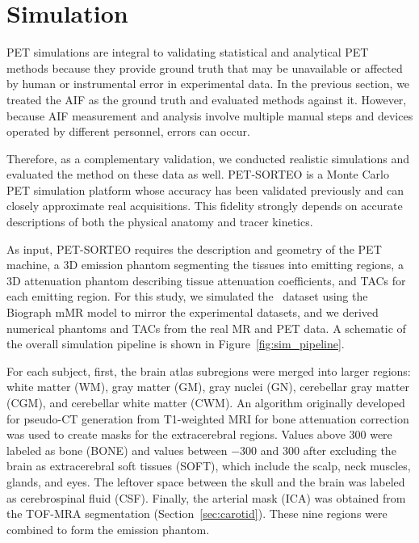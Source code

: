 \section{Simulation}\label{sec:methods_simulation}
PET simulations are integral to validating statistical and analytical PET methods because they provide ground truth that may be unavailable or affected by human or instrumental error in experimental data.
In the previous section, we treated the AIF as the ground truth and evaluated methods against it.
However, because AIF measurement and analysis involve multiple manual steps and devices operated by different personnel, errors can occur.

Therefore, as a complementary validation, we conducted realistic simulations and evaluated the method on these data as well.
PET-SORTEO is a Monte Carlo PET simulation platform \cite{reilhac2004pet,reilhac2016validation} whose accuracy has been validated previously \cite{reilhac2005pet} and can closely approximate real acquisitions.
This fidelity strongly depends on accurate descriptions of both the physical anatomy and tracer kinetics.

As input, PET-SORTEO requires the description and geometry of the PET machine, a 3D emission phantom segmenting the tissues into emitting regions, a 3D attenuation phantom describing tissue attenuation coefficients, and TACs for each emitting region.
For this study, we simulated the \fdg\ dataset using the Biograph mMR model to mirror the experimental datasets, and we derived numerical phantoms and TACs from the real MR and PET data.
A schematic of the overall simulation pipeline is shown in Figure~\ref{fig:sim_pipeline}.

For each subject, first, the brain atlas subregions were merged into larger regions: white matter (WM), gray matter (GM), gray nuclei (GN), cerebellar gray matter (CGM), and cerebellar white matter (CWM).
An algorithm originally developed for pseudo-CT generation from T1-weighted MRI for bone attenuation correction was used to create masks for the extracerebral regions\cite{mérid2017}.
Values above 300 were labeled as bone (BONE) and values between \(-300\) and \(300\) after excluding the brain as extracerebral soft tissues (SOFT), which include the scalp, neck muscles, glands, and eyes.
The leftover space between the skull and the brain was labeled as cerebrospinal fluid (CSF).
Finally, the arterial mask (ICA) was obtained from the TOF-MRA segmentation (Section~\ref{sec:carotid}).
These nine regions were combined to form the emission phantom.

